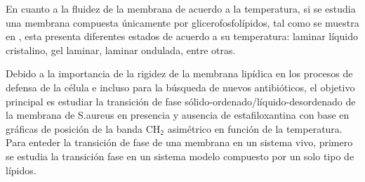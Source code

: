 \documentclass[%
 reprint,
 amsmath,amssymb,
 aps,
]{revtex4-1}
\begin{document}
En cuanto a la fluidez de la membrana de acuerdo a la temperatura, si se estudia una membrana compuesta únicamente por glicerofosfolípidos, tal como se muestra en \cite{Heimburg}, esta presenta diferentes estados de acuerdo a su temperatura:  laminar líquido cristalino, gel laminar, laminar ondulada, entre otras.

Debido a la importancia de la rigidez de la membrana lipídica en los procesos de defensa de la célula e incluso para la búsqueda de nuevos antibióticos, el objetivo principal es estudiar la transición de fase sólido-ordenado/líquido-desordenado de la membrana de S.aureus en presencia y ausencia de estafiloxantina con base en gráficas de posición de la banda CH$_{2}$ asimétrico en función de la temperatura.\\
Para enteder la transición de fase de una membrana en un sistema vivo, primero se estudia la transición fase en un sistema modelo compuesto por un solo tipo de lípidos.
\end{document}
